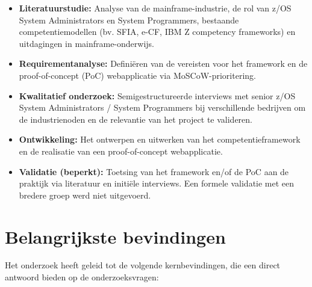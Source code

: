 \begin{itemize}
	\item \textbf{Literatuurstudie:} Analyse van de mainframe-industrie, de rol van z/OS System Administrators en System Programmers, bestaande competentiemodellen (bv. SFIA, e-CF, IBM Z competency frameworks) en uitdagingen in mainframe-onderwijs.
	
	\item \textbf{Requirementanalyse:} Definiëren van de vereisten voor het framework en de proof-of-concept (PoC) webapplicatie via MoSCoW-prioritering.
	
	\item \textbf{Kwalitatief onderzoek:} Semigestructureerde interviews met senior z/OS System Administrators / System Programmers bij verschillende bedrijven om de industrienoden en de relevantie van het project te valideren.
	
	\item \textbf{Ontwikkeling:} Het ontwerpen en uitwerken van het competentieframework en de realisatie van een proof-of-concept webapplicatie.
	
	\item \textbf{Validatie (beperkt):} Toetsing van het framework en/of de PoC aan de praktijk via literatuur en initiële interviews. Een formele validatie met een bredere groep werd niet uitgevoerd.
\end{itemize}

\section{Belangrijkste bevindingen}

Het onderzoek heeft geleid tot de volgende kernbevindingen, die een direct antwoord bieden op de onderzoeksvragen:

